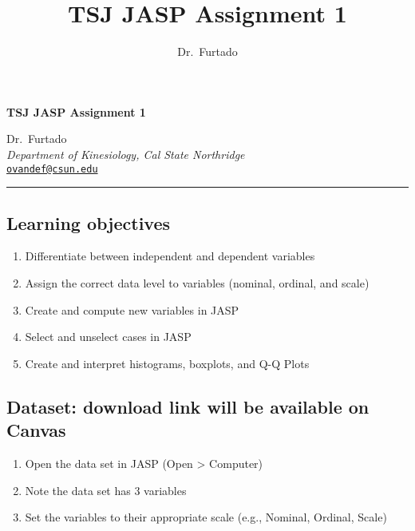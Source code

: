 \documentclass[11pt,]{article}
\title{TSJ \textbar{} JASP Assignment 1}
\author{Dr.~Furtado}
\date{}
\newcommand{\blankline}{\quad\pagebreak[2]}
\providecommand{\tightlist}{%
  \setlength{\itemsep}{0pt}\setlength{\parskip}{0pt}}
\begin{document}
  



\thispagestyle{plain} 

\begin{flushleft}\Large \bf TSJ \textbar{} JASP Assignment
1  \end{flushleft}
	\vspace{1 mm}   
Dr.~Furtado \\
\emph{Department of Kinesiology, Cal State Northridge} \\
\texttt{\href{mailto:ovandef@csun.edu}{\nolinkurl{ovandef@csun.edu}}}   \\

  

\hrule

\vspace{6 mm}
	


\hypertarget{learning-objectives}{%
\subsection{Learning objectives}\label{learning-objectives}}

\begin{enumerate}
\def\labelenumi{\arabic{enumi}.}
\tightlist
\item
  Differentiate between independent and dependent variables
\item
  Assign the correct data level to variables (nominal, ordinal, and
  scale)
\item
  Create and compute new variables in JASP
\item
  Select and unselect cases in JASP
\item
  Create and interpret histograms, boxplots, and Q-Q Plots
\end{enumerate}

\hypertarget{dataset-download-link-will-be-available-on-canvas}{%
\subsection{Dataset: download link will be available on
Canvas}\label{dataset-download-link-will-be-available-on-canvas}}

\begin{enumerate}
\def\labelenumi{\arabic{enumi}.}
\tightlist
\item
  Open the data set in JASP (Open \textgreater{} Computer)
\item
  Note the data set has 3 variables
\item
  Set the variables to their appropriate scale (e.g., Nominal, Ordinal,
  Scale)
\end{enumerate}
\end{document}
